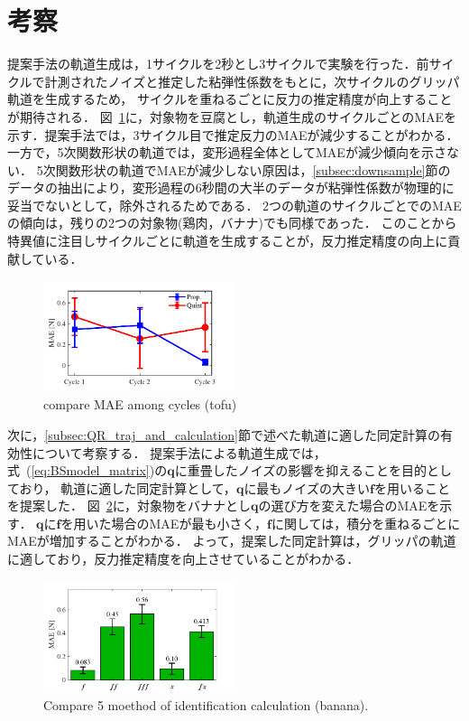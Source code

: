 \documentclass[a4paper]{jarticle}
\begin{document}
\section{考察}
提案手法の軌道生成は，1サイクルを2秒とし3サイクルで実験を行った．前サイクルで計測されたノイズと推定した粘弾性係数をもとに，次サイクルのグリッパ軌道を生成するため，
サイクルを重ねるごとに反力の推定精度が向上することが期待される．
図~\ref{fig:compare_cycle_MAE}に，対象物を豆腐とし，軌道生成のサイクルごとのMAEを示す．提案手法では，3サイクル目で推定反力のMAEが減少することがわかる．
一方で，5次関数形状の軌道では，変形過程全体としてMAEが減少傾向を示さない．
5次関数形状の軌道でMAEが減少しない原因は，\ref{subsec:downsample}節のデータの抽出により，変形過程の6秒間の大半のデータが粘弾性係数が物理的に妥当でないとして，除外されるためである．
2つの軌道のサイクルごとでのMAEの傾向は，残りの2つの対象物(鶏肉，バナナ)でも同様であった．
このことから特異値に注目しサイクルごとに軌道を生成することが，反力推定精度の向上に貢献している．
\begin{figure}[t]
    \centering
    \includegraphics[width=0.5\textwidth]{compare_cycle_MAE.pdf}
    \caption{compare MAE among cycles (tofu)}
    \label{fig:compare_cycle_MAE}
\end{figure}

次に，\ref{subsec:QR_traj_and_calculation}節で述べた軌道に適した同定計算の有効性について考察する．
提案手法による軌道生成では，式~(\ref{eq:BSmodel_matrix})の$\mathbf{q}$に重畳したノイズの影響を抑えることを目的としており，
軌道に適した同定計算として，$\mathbf{q}$に最もノイズの大きい$\boldsymbol{f}$を用いることを提案した．
図~\ref{fig:compare_select5mode}に，対象物をバナナとし$\mathbf{q}$の選び方を変えた場合のMAEを示す．
$\mathbf{q}$に$\boldsymbol{f}$を用いた場合のMAEが最も小さく，$\boldsymbol{{f}}$に関しては，積分を重ねるごとにMAEが増加することがわかる．
よって，提案した同定計算は，グリッパの軌道に適しており，反力推定精度を向上させていることがわかる．
\begin{figure}[t]
    \centering
    \includegraphics[width=0.5\textwidth]{select_differet_q_banana.pdf}
    \captionsetup{width=0.9\linewidth} %
    \caption{Compare 5 moethod of identification calculation (banana).}
    \label{fig:compare_select5mode}
\end{figure}
\end{document}
